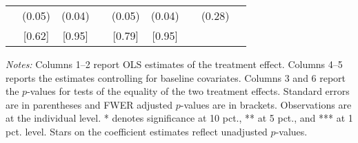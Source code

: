 \begin{table}[h]
{\begin{threeparttable}
\begin{tabular}{l*{8}{c}}
          &   (0.05)&   (0.04)&         &   (0.05)&   (0.04)&         &   (0.28)&         \\
          &   [0.62]&   [0.95]&         &   [0.79]&   [0.95]&         &         &         \\
\bottomrule \end{tabular} \begin{tablenotes}[flushleft] \footnotesize \item \emph{Notes:} Columns 1--2 report OLS estimates of the treatment effect. Columns 4--5 reports the estimates controlling for baseline covariates. Columns 3 and 6 report the \(p\)-values for tests of the equality of the two treatment effects. Standard errors are in parentheses and FWER adjusted \(p\)-values are in brackets. Observations are at the individual level. * denotes significance at 10 pct., ** at 5 pct., and *** at 1 pct. level. Stars on the coefficient estimates reflect unadjusted \(p\)-values. \end{tablenotes} \end{threeparttable} } \end{table}

